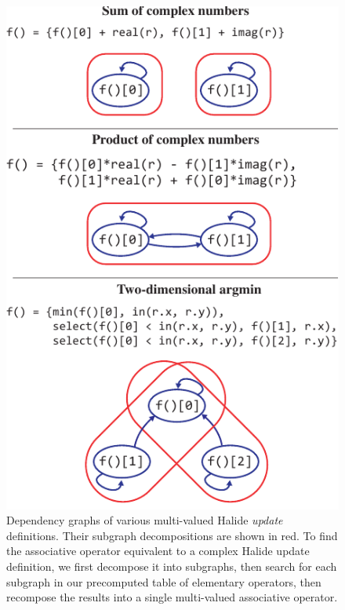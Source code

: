 



\begin{figure}[tb]
\centering
\includegraphics{subgraphs}
\caption{Dependency graphs of various multi-valued Halide \emph{update} definitions. Their subgraph decompositions are shown in red. To find the associative operator equivalent to a complex Halide update definition, we first decompose it into subgraphs, then search for each subgraph in our precomputed table of elementary operators, then recompose the results into a single multi-valued associative operator.}
\label{fig:subgraphs}
\end{figure}

